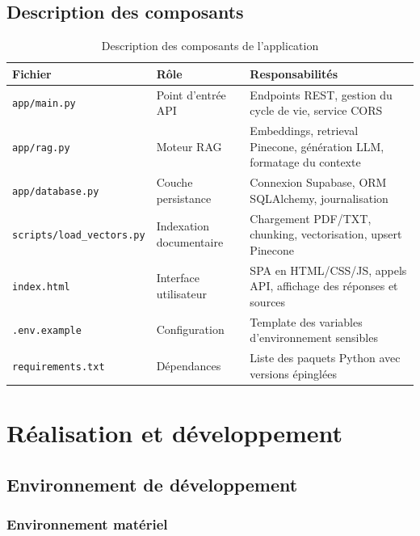 \documentclass[12pt, a4paper, twoside]{report}
\newcommand{\file}[1]{\texttt{\footnotesize #1}}
\begin{document}
\section{Description des composants}

\begin{table}[H]
\centering
\caption{Description des composants de l'application}
\label{tab:composants}
\begin{tabularx}{\textwidth}{l l X}
\toprule
\rowcolor{primary!10}
\textbf{Fichier} & \textbf{Rôle} & \textbf{Responsabilités} \\
\midrule
\file{app/main.py}            & Point d'entrée API      & Endpoints REST, gestion du cycle de vie, service CORS \\
\file{app/rag.py}             & Moteur RAG              & Embeddings, retrieval Pinecone, génération LLM, formatage du contexte \\
\file{app/database.py}        & Couche persistance      & Connexion Supabase, ORM SQLAlchemy, journalisation \\
\file{scripts/load\_vectors.py} & Indexation documentaire & Chargement PDF/TXT, chunking, vectorisation, upsert Pinecone \\
\file{index.html}             & Interface utilisateur   & SPA en HTML/CSS/JS, appels API, affichage des réponses et sources \\
\file{.env.example}           & Configuration           & Template des variables d'environnement sensibles \\
\file{requirements.txt}       & Dépendances             & Liste des paquets Python avec versions épinglées \\
\bottomrule
\end{tabularx}
\end{table}

\cleardoublepage

\chapter{Réalisation et développement}

\section{Environnement de développement}

\subsection{Environnement matériel}
\end{document}

